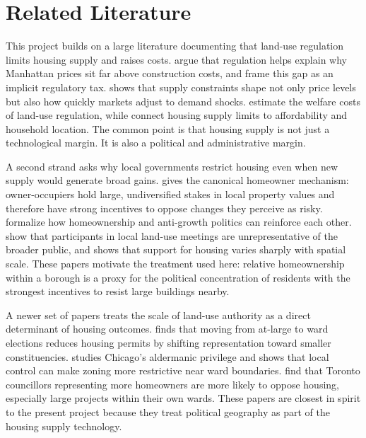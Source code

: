 \section{Related Literature}
\label{sec:literature}

This project builds on a large literature documenting that land-use regulation limits housing supply and raises costs. \citet{glaeser_why_2005} argue that regulation helps explain why Manhattan prices sit far above construction costs, and \citet{glaeser_economic_2018} frame this gap as an implicit regulatory tax. \citet{paciorek_supply_2013} shows that supply constraints shape not only price levels but also how quickly markets adjust to demand shocks. \citet{turner_land_2014} estimate the welfare costs of land-use regulation, while \citet{molloy_housing_2022} connect housing supply limits to affordability and household location. The common point is that housing supply is not just a technological margin. It is also a political and administrative margin.

A second strand asks why local governments restrict housing even when new supply would generate broad gains.
\citet{fischel_homevoter_2009} gives the canonical homeowner mechanism: owner-occupiers hold large, undiversified stakes in local property values and therefore have strong incentives to oppose changes they perceive as risky.
\citet{ortalo-magne_political_2014} formalize how homeownership and anti-growth politics can reinforce each other.
\citet{einstein_neighborhood_2019} show that participants in local land-use meetings are unrepresentative of the broader public,
and \citet{hankinson_when_2018} shows that support for housing varies sharply with spatial scale.
These papers motivate the treatment used here: relative homeownership within a borough is a proxy for the political concentration of residents with the strongest incentives to resist large buildings nearby.

A newer set of papers treats the scale of land-use authority as a direct determinant of housing outcomes. \citet{mast_warding_2024} finds that moving from at-large to ward elections reduces housing permits by shifting representation toward smaller constituencies.
\citet{khan_decentralized_2021} studies Chicago's aldermanic privilege and shows that local control can make zoning more restrictive near ward boundaries.
\citet{fang_homeowner_2023} find that Toronto councillors representing more homeowners are more likely to oppose housing, especially large projects within their own wards.
These papers are closest in spirit to the present project because they treat political geography as part of the housing supply technology.


